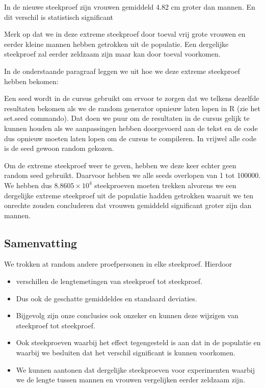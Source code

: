 \documentclass[
  12pt,dutch]{book}
\theoremstyle{definition}
\theoremstyle{definition}
\theoremstyle{definition}
\theoremstyle{definition}
\theoremstyle{remark}
\begin{document}
In de nieuwe steekproef zijn vrouwen gemiddeld 4.82 cm groter dan mannen. En dit verschil is statistisch significant

Merk op dat we in deze extreme steekproef door toeval vrij grote vrouwen en eerder kleine mannen hebben getrokken uit de populatie. Een dergelijke steekproef zal eerder zeldzaam zijn maar kan door toeval voorkomen.

In de onderstaande paragraaf leggen we uit hoe we deze extreme steekproef hebben bekomen:

Een seed wordt in de cursus gebruikt om ervoor te zorgen dat we telkens dezelfde resultaten bekomen als we de random generator opnieuw laten lopen in R (zie het set.seed commando). Dat doen we puur om de resultaten in de cursus gelijk te kunnen houden als we aanpassingen hebben doorgevoerd aan de tekst en de code dus opnieuw moeten laten lopen om de cursus te compileren. In vrijwel alle code is de seed gewoon random gekozen.

Om de extreme steekproef weer te geven, hebben we deze keer echter geen random seed gebruikt. Daarvoor hebben we alle seeds overlopen van 1 tot 100000. We hebben dus \ensuremath{8.8605\times 10^{4}} steekproeven moeten trekken alvorens we een dergelijke extreme steekproef uit de populatie hadden getrokken waaruit we ten onrechte zouden concluderen dat vrouwen gemiddeld significant groter zijn dan mannen.

\subsection{Samenvatting}\label{samenvatting}

We trokken at random andere proefpersonen in elke steekproef. Hierdoor

\begin{itemize}
\item
  verschillen de lengtemetingen van steekproef tot steekproef.
\item
  Dus ook de geschatte gemiddeldes en standaard deviaties.
\item
  Bijgevolg zijn onze conclusies ook onzeker en kunnen deze wijzigen van steekproef tot steekproef.
\item
  Ook steekproeven waarbij het effect tegengesteld is aan dat in de populatie en waarbij we besluiten dat het verschil significant is kunnen voorkomen.
\item
  We kunnen aantonen dat dergelijke steekproeven voor experimenten waarbij we de lengte tussen mannen en vrouwen vergelijken eerder zeldzaam zijn.
\end{itemize}
\end{document}
